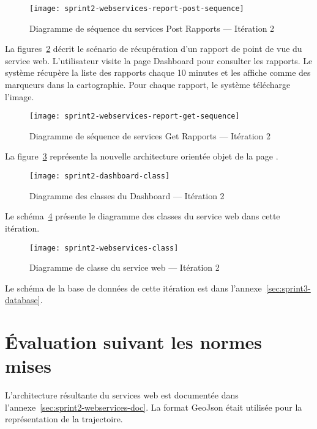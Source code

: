 \begin{figure}[H]
    \centering
    \texttt{[image: sprint2-webservices-report-post-sequence]}
    \caption{Diagramme de séquence du services Post Rapports --- Itération 2}
\label{fig:sprint2-webservices-report-post-sequence}
\end{figure}

La figures~\ref{fig:sprint2-webservices-report-get-sequence} décrit le
scénario de récupération d'un rapport de point de vue du service
web. L'utilisateur visite la page Dashboard pour consulter les rapports.  Le
système récupère la liste des rapports chaque 10 minutes et les affiche comme
des marqueurs dans la cartographie.  Pour chaque rapport, le système télécharge
l'image.

\begin{figure}[H]
    \centering
    \texttt{[image: sprint2-webservices-report-get-sequence]}
    \caption{Diagramme de séquence de services Get Rapports --- Itération 2}
\label{fig:sprint2-webservices-report-get-sequence}
\end{figure}

La figure~\ref{fig:sprint2-dashboard-class} représente la nouvelle architecture
orientée objet de la page .

\begin{figure}[H]
    \centering
    \texttt{[image: sprint2-dashboard-class]}
    \caption{Diagramme des classes du Dashboard --- Itération 2}
\label{fig:sprint2-dashboard-class}
\end{figure}

Le schéma~\ref{fig:sprint2-webservices-class} présente le diagramme des classes
du service web dans cette itération.

\begin{figure}[H]
    \centering
    \texttt{[image: sprint2-webservices-class]}
    \caption{Diagramme de classe du service web --- Itération 2}
\label{fig:sprint2-webservices-class}
\end{figure}

Le schéma de la base de données de cette itération est dans
l'annexe~\ref{sec:sprint3-database}.

\section{Évaluation suivant les normes mises}

L'architecture résultante du services web est documentée dans
l'annexe~\ref{sec:sprint2-webservices-doc}. La format GeoJson était utilisée
pour la représentation de la trajectoire.

